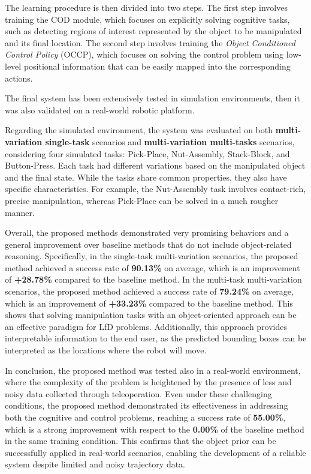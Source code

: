 The learning procedure is then divided into two steps. The first step involves training the COD module, which focuses on explicitly solving cognitive tasks, such as detecting regions of interest represented by the object to be manipulated and its final location. The second step involves training the \textit{Object Conditioned Control Policy} (OCCP), which focuses on solving the control problem using low-level positional information that can be easily mapped into the corresponding actions.

The final system has been extensively tested in simulation environments, then it was also validated on a real-world robotic platform. 

Regarding the simulated environment, the system was evaluated on both \textbf{multi-variation single-task} scenarios and \textbf{multi-variation multi-tasks} scenarios, considering four simulated tasks: Pick-Place, Nut-Assembly, Stack-Block, and  Button-Press. Each task had different variations based on the manipulated object and the final state. While the tasks share common properties, they also have specific characteristics. For example, the Nut-Assembly task involves contact-rich, precise manipulation, whereas Pick-Place can be solved in a much rougher manner.

Overall, the proposed methods demonstrated very promising behaviors and a general improvement over baseline methods that do not include object-related reasoning. Specifically, in the single-task multi-variation scenarios, the proposed method achieved a success rate of \textbf{90.13\%} on average, which is an improvement of \textbf{+28.78\%} compared to the baseline method. In the multi-task multi-variation scenarios, the proposed method achieved a success rate of \textbf{79.24\%} on average, which is an improvement of \textbf{+33.23\%} compared to the baseline method.
This shows that solving manipulation tasks with an object-oriented approach can be an effective paradigm for LfD problems. Additionally, this approach provides interpretable information to the end user, as the predicted bounding boxes can be interpreted as the locations where the robot will move.

In conclusion, the proposed method was tested also in a real-world environment, where the complexity of the problem is heightened by the presence of less and noisy data collected through teleoperation. Even under these challenging conditions, the proposed method demonstrated its effectiveness in addressing both the cognitive and control problems, reaching a success rate of \textbf{55.00\%}, which is a strong improvement with respect to the \textbf{0.00\%} of the baseline method in the same training condition. This confirms that the object prior can be successfully applied in real-world scenarios, enabling the development of a reliable system despite limited and noisy trajectory data.
